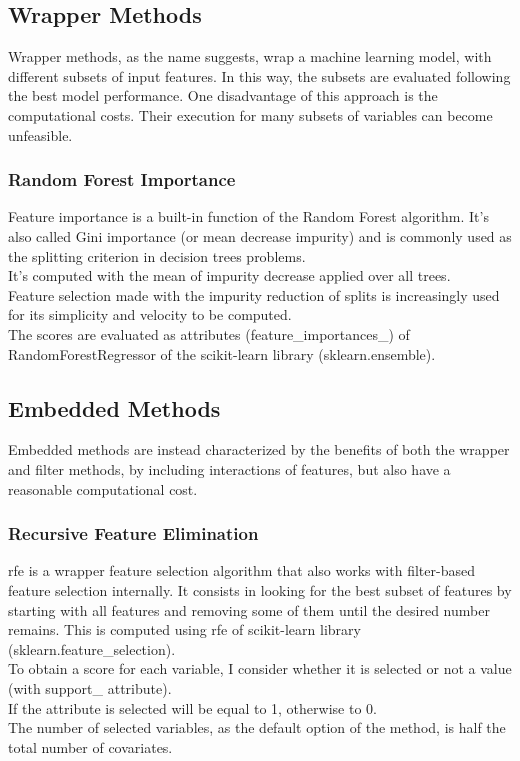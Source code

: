 \subsection{Wrapper Methods}
Wrapper methods, as the name suggests, wrap a machine learning model, with different subsets of input features. In this way, the subsets are evaluated following the best model performance.
One disadvantage of this approach is the computational costs.\newline
Their execution for many subsets of variables can become unfeasible. 
\subsubsection{Random Forest Importance}
Feature importance is a built-in function of the Random Forest algorithm. It's also called Gini importance (or mean decrease impurity) and is commonly used as the splitting criterion in decision trees problems. \\
It's computed with the mean of impurity decrease applied over all trees. \\ 
Feature selection made with the impurity reduction of splits is increasingly used for its simplicity and velocity to be computed.\\
The scores are evaluated as attributes (feature\_importances\_) of RandomForestRegressor of the scikit-learn library (sklearn.ensemble).
\bigbreak
\subsection{Embedded Methods}
Embedded methods are instead characterized by the benefits of both the wrapper and filter methods, by including interactions of features, but also have a reasonable computational cost.
\subsubsection{Recursive Feature Elimination}
\gls{rfe} is a wrapper feature selection algorithm that also works with filter-based feature selection internally.\newline
It consists in looking for the best subset of features by starting with all features and removing some of them until the desired number remains.\newline
This is computed using \acrshort{rfe} of scikit-learn library (sklearn.feature\_selection).\\
To obtain a score for each variable, I consider whether it is selected or not a value (with support\_ attribute).\\
If the attribute is selected will be equal to 1, otherwise to 0.\\
The number of selected variables, as the default option of the method, is half the total number of covariates.
\pagebreak
